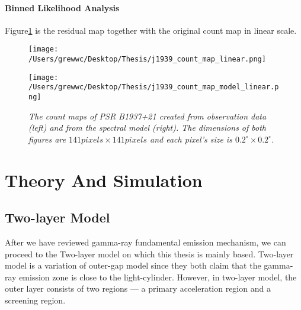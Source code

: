 \documentclass[12pt]{report}
\newcommand{\mycaption}[1]{\caption{\textit{\footnotesize #1}}}
\begin{document}
        \subsubsection{Binned Likelihood Analysis}
          Figure\ref{fig: j1939_count_map_diff} is the residual map together with the 
          original count map in linear scale.
          \begin{figure}[!ht]
            \begin{center}
            \begin{minipage}{0.45\textwidth}
              \begin{center} 
                \texttt{[image: /Users/grewwc/Desktop/Thesis/j1939\_count\_map\_linear.png]}
              \end{center}
            \end{minipage}
            \begin{minipage}{0.45\textwidth}
              \begin{center}
                \texttt{[image: /Users/grewwc/Desktop/Thesis/j1939\_count\_map\_model\_linear.png]}
              \end{center}
            \end{minipage}
          \end{center}
          \mycaption{The count maps of PSR B1937+21 created from observation 
          data (\textsf{left}) and from the spectral model (\textsf{right}). The dimensions
          of both figures are $141 pixels \times 141 pixels$ and each pixel's size is
          $0.2^{\circ}\times0.2^{\circ}$.}
          \label{fig: j1939_count_map_diff}
        \end{figure}
        \vspace{1cm}

    \chapter{Theory And Simulation}
      \section{Two-layer Model}
      After we have reviewed gamma-ray fundamental emission mechanism, we can proceed to
      the Two-layer model on which this thesis is mainly based. Two-layer model is a 
      variation of outer-gap model since they both claim that the gamma-ray emission zone
      is close to the light-cylinder. However, in two-layer model, the outer layer 
      consists of two regions --- a primary acceleration region and a screening region. 
\end{document}
